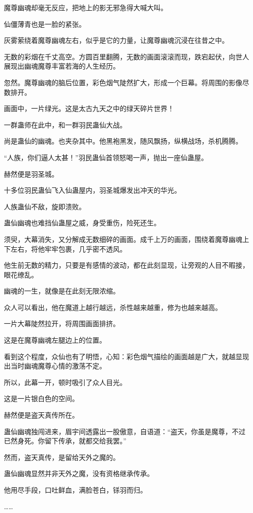 \begin{this_body}
魔尊幽魂却毫无反应，把地上的影无邪急得大喊大叫。

仙僵薄青也是一脸的紧张。

灰雾萦绕着魔尊幽魂左右，似乎是它的力量，让魔尊幽魂沉浸在往昔之中。

无数的彩烟在千丈高空。方圆百里翻腾，无数的画面滚滚而现，跌宕起伏，向世人展现出幽魂魔尊丰富若海的人生经历。

忽然。魔尊幽魂的脑后位置，彩色烟气陡然扩大，形成一个巨幕。将周围的影像尽数排开。

画面中，一片绿光。这是太古九天之中的绿天碎片世界！

一群蛊师在此中，和一群羽民蛊仙大战。

尚是蛊仙的幽魂。也夹杂其中。他黑袍黑发，随风飘扬，纵横战场，杀机腾腾。

“人族，你们逼人太甚！”羽民蛊仙首领怒喝一声，抛出一座仙蛊屋。

赫然便是羽圣城。

十多位羽民蛊仙飞入仙蛊屋内，羽圣城爆发出冲天的华光。

人族蛊仙不敌，旋即溃败。

蛊仙幽魂也难挡仙蛊屋之威，身受重伤，险死还生。

须臾，大幕消失，又分解成无数细碎的画面。成千上万的画面，围绕着魔尊幽魂上下左右，将他牢牢包裹，几乎密不透风。

他生前无数的精力，只要是有感情的波动，都在此刻显现，让旁观的人目不暇接，眼花缭乱。

幽魂的一生，就像是在此刻无限浓缩。

众人可以看出，他在魔道上越行越远，杀性越来越重，修为也越来越高。

一片大幕陡然拉开，将周围画面排挤。

这是在魔尊幽魂左腿边上的位置。

看到这个程度，众仙也有了明悟，心知：彩色烟气描绘的画面越是广大，就越显现出当时幽魂魔尊心情的激荡不定。

所以，此幕一开，顿时吸引了众人目光。

这是一片银白色的空间。

赫然便是盗天真传所在。

蛊仙幽魂独闯进来，眉宇间透露出一股傲意，自语道：“盗天，你虽是魔尊，不过已然身死。你留下传承，就都交给我罢。”

然而，盗天真传，是留给天外之魔的。

蛊仙幽魂显然并非天外之魔，没有资格继承传承。

他用尽手段，口吐鲜血，满脸苍白，铩羽而归。

……


\end{this_body}
